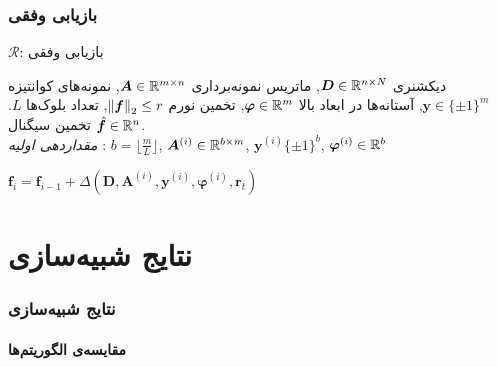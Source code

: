 \begin{frame}
\frametitle{بازیابی وفقی}
\begin{algorithm}[H]
	\caption{$ \mathcal{R} $: بازیابی وفقی}
	\label{alg:AR}
	\begin{algorithmic}[1]
		\renewcommand{\algorithmicrequire}{\textbf{ورودی:}}
		\renewcommand{\algorithmicensure}{\textbf{خروجی:}}
		\REQUIRE دیکشنری $ \bm{D}\in\mathbb{R}^{n\times N} $, ماتریس نمونه‌برداری $ \bm{A}\in\mathbb{R}^{m\times n} $, نمونه‌های کوانتیزه $ \bm{y} \in \lbrace\pm 1\rbrace^{m} $, آستانه‌ها در ابعاد بالا $ \bm{\varphi}\in\mathbb{R}^{m} $, تخمین نورم $ \left\lVert\bm{f}\right\rVert_{2}\leq r $, تعداد بلوک‌ها $ L $.
		\ENSURE  تخمین سیگنال $ \hat{\bm{f}}\in \mathbb{R}^{n} $.
		\\ \textit{مقداردهی اولیه} :  $ b = \lfloor\frac{m}{L}\rfloor $, $ \bm{A}^{(i)}\in \mathbb{R}^{b\times m}$, $ \bm{y}^{\left(i\right)} \lbrace\pm 1\rbrace^{b}$, $\bm{\varphi}^{\left(i\right)}\in \mathbb{R}^{b} $
		\begin{latin}
		\STATE $ \bm{f}_{i} =\bm{f}_{i-1}+ \varDelta\left(\bm{D},\bm{A}^{(i)},\bm{y}^{\left(i\right)},\bm{\varphi}^{\left(i\right)},\bm{r}_{t}\right) $ 
		\ENDFOR
		\end{latin}
	\end{algorithmic} 
\end{algorithm}
\end{frame}

\section{نتایج شبیه‌سازی\hfill}

\begin{frame}
\frametitle{نتایج شبیه‌سازی}
\framesubtitle{مقایسه‌ی الگوریتم‌ها}
\end{frame}

